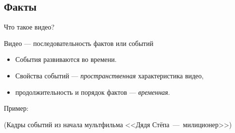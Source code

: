

\subsection{Факты}

\begin{frame}{Что такое видео?}
    \begin{gray-box}{Видео — последовательность фактов или событий}
        \begin{itemize}
            \item События развиваются во времени.
            \item Свойства событий
            — {\it пространственная} характеристика видео,
            \item продолжительность и порядок фактов — {\it временная}.
        \end{itemize}%
    \end{gray-box}
    \vspace{1.5em}
    Пример:
    \begin{center}
        \footnotesize
        \color{zdarkgreen} 
        (Кадры событий из начала мультфильма 
        <<Дядя Стёпа~—~милиционер>>)
    \end{center}%
\end{frame}

